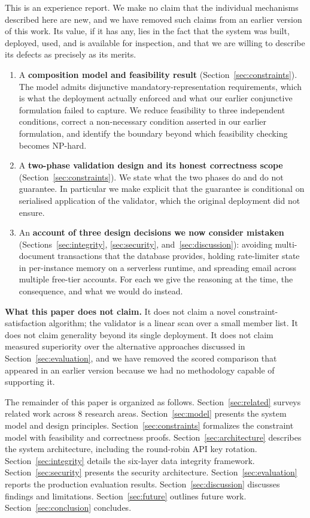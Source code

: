 \documentclass[11pt,a4paper]{article}
\theoremstyle{plain}
\theoremstyle{definition}
\theoremstyle{remark}
\begin{document}
This is an experience report. We make no claim that the individual mechanisms described here are new, and we have removed such claims from an earlier version of this work. Its value, if it has any, lies in the fact that the system was built, deployed, used, and is available for inspection, and that we are willing to describe its defects as precisely as its merits.

\begin{enumerate}[noitemsep,topsep=4pt]
    \item A \textbf{composition model and feasibility result} (Section~\ref{sec:constraints}). The model admits disjunctive mandatory-representation requirements, which is what the deployment actually enforced and what our earlier conjunctive formulation failed to capture. We reduce feasibility to three independent conditions, correct a non-necessary condition asserted in our earlier formulation, and identify the boundary beyond which feasibility checking becomes NP-hard.

    \item A \textbf{two-phase validation design and its honest correctness scope} (Section~\ref{sec:constraints}). We state what the two phases do and do not guarantee. In particular we make explicit that the guarantee is conditional on serialised application of the validator, which the original deployment did not ensure.

    \item An \textbf{account of three design decisions we now consider mistaken} (Sections~\ref{sec:integrity}, \ref{sec:security}, and~\ref{sec:discussion}): avoiding multi-document transactions that the database provides, holding rate-limiter state in per-instance memory on a serverless runtime, and spreading email across multiple free-tier accounts. For each we give the reasoning at the time, the consequence, and what we would do instead.
\end{enumerate}

\noindent\textbf{What this paper does not claim.} It does not claim a novel constraint-satisfaction algorithm; the validator is a linear scan over a small member list. It does not claim generality beyond its single deployment. It does not claim measured superiority over the alternative approaches discussed in Section~\ref{sec:evaluation}, and we have removed the scored comparison that appeared in an earlier version because we had no methodology capable of supporting it.

The remainder of this paper is organized as follows. Section~\ref{sec:related} surveys related work across 8 research areas. Section~\ref{sec:model} presents the system model and design principles. Section~\ref{sec:constraints} formalizes the constraint model with feasibility and correctness proofs. Section~\ref{sec:architecture} describes the system architecture, including the round-robin API key rotation. Section~\ref{sec:integrity} details the six-layer data integrity framework. Section~\ref{sec:security} presents the security architecture. Section~\ref{sec:evaluation} reports the production evaluation results. Section~\ref{sec:discussion} discusses findings and limitations. Section~\ref{sec:future} outlines future work. Section~\ref{sec:conclusion} concludes.
\end{document}
